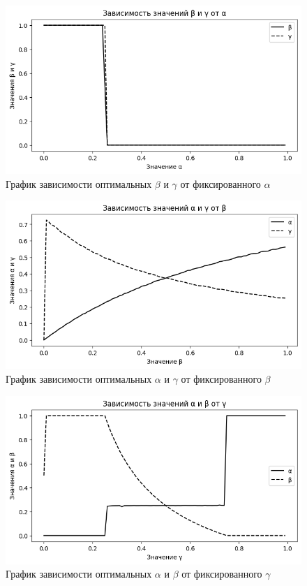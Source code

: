 \begin{figure}[H]
	\centering
	\includegraphics[width=0.8\linewidth]{inc/img/c3ex2alpha}
	\caption{График зависимости оптимальных $ \beta$ и $ \gamma$ от фиксированного $ \alpha$}
	\label{fig:c3ex2alpha}
\end{figure}

\begin{figure}[H]
	\centering
	\includegraphics[width=0.8\linewidth]{inc/img/c3ex2beta}
	\caption{График зависимости оптимальных $\alpha $ и $ \gamma$ от фиксированного $ \beta$}
	\label{fig:c3ex2beta}
\end{figure}

\begin{figure}[H]
	\centering
	\includegraphics[width=0.8\linewidth]{inc/img/c3ex2gamma}
	\caption{График зависимости оптимальных $\alpha $ и $ \beta$ от фиксированного $ \gamma$}
	\label{fig:c3ex2gamma}
\end{figure}

